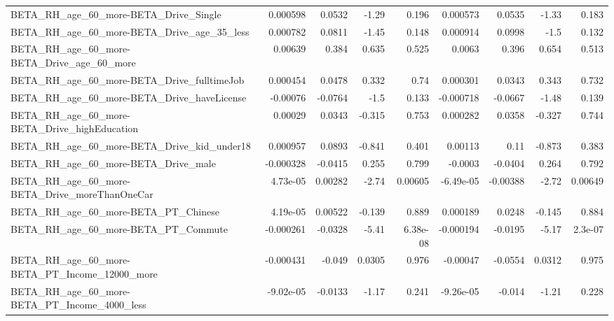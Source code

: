 \begin{tabular}{lrrrrrrrr}
BETA\_RH\_age\_60\_more-BETA\_Drive\_Single              &    0.000598 &       0.0532 &     -1.29 &    0.196 &   0.000573 &      0.0535 &        -1.33 &         0.183 \\
BETA\_RH\_age\_60\_more-BETA\_Drive\_age\_35\_less         &    0.000782 &       0.0811 &     -1.45 &    0.148 &   0.000914 &      0.0998 &         -1.5 &         0.132 \\
BETA\_RH\_age\_60\_more-BETA\_Drive\_age\_60\_more         &     0.00639 &        0.384 &     0.635 &    0.525 &     0.0063 &       0.396 &        0.654 &         0.513 \\
BETA\_RH\_age\_60\_more-BETA\_Drive\_fulltimeJob         &    0.000454 &       0.0478 &     0.332 &     0.74 &   0.000301 &      0.0343 &        0.343 &         0.732 \\
BETA\_RH\_age\_60\_more-BETA\_Drive\_haveLicense         &    -0.00076 &      -0.0764 &      -1.5 &    0.133 &  -0.000718 &     -0.0667 &        -1.48 &         0.139 \\
BETA\_RH\_age\_60\_more-BETA\_Drive\_highEducation       &     0.00029 &       0.0343 &    -0.315 &    0.753 &   0.000282 &      0.0358 &       -0.327 &         0.744 \\
BETA\_RH\_age\_60\_more-BETA\_Drive\_kid\_under18         &    0.000957 &       0.0893 &    -0.841 &    0.401 &    0.00113 &        0.11 &       -0.873 &         0.383 \\
BETA\_RH\_age\_60\_more-BETA\_Drive\_male                &   -0.000328 &      -0.0415 &     0.255 &    0.799 &    -0.0003 &     -0.0404 &        0.264 &         0.792 \\
BETA\_RH\_age\_60\_more-BETA\_Drive\_moreThanOneCar      &    4.73e-05 &      0.00282 &     -2.74 &  0.00605 &  -6.49e-05 &    -0.00388 &        -2.72 &       0.00649 \\
BETA\_RH\_age\_60\_more-BETA\_PT\_Chinese                &    4.19e-05 &      0.00522 &    -0.139 &    0.889 &   0.000189 &      0.0248 &       -0.145 &         0.884 \\
BETA\_RH\_age\_60\_more-BETA\_PT\_Commute                &   -0.000261 &      -0.0328 &     -5.41 & 6.38e-08 &  -0.000194 &     -0.0195 &        -5.17 &       2.3e-07 \\
BETA\_RH\_age\_60\_more-BETA\_PT\_Income\_12000\_more      &   -0.000431 &       -0.049 &    0.0305 &    0.976 &   -0.00047 &     -0.0554 &       0.0312 &         0.975 \\
BETA\_RH\_age\_60\_more-BETA\_PT\_Income\_4000\_less       &   -9.02e-05 &      -0.0133 &     -1.17 &    0.241 &  -9.26e-05 &      -0.014 &        -1.21 &         0.228 \\

\end{tabular}

